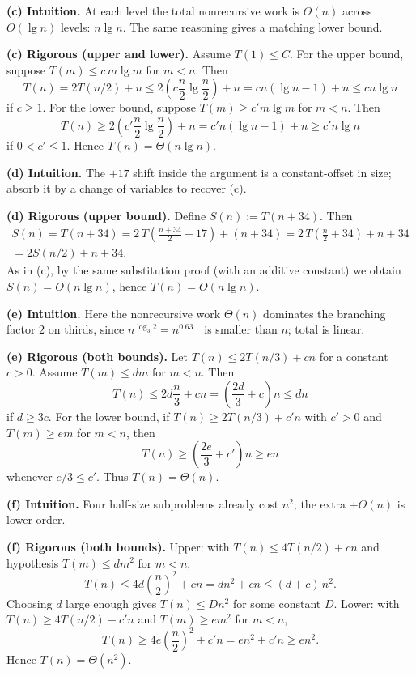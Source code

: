 \documentclass[12pt]{article}
\theoremstyle{definition}
\begin{document}
\textbf{(c) Intuition.}
At each level the total nonrecursive work is $\Theta(n)$ across $O(\lg n)$ levels: $n\lg n$.
The same reasoning gives a matching lower bound.

\textbf{(c) Rigorous (upper and lower).}
Assume $T(1)\le C$.
For the upper bound, suppose $T(m)\le c\, m\lg m$ for $m<n$.
Then
\[
T(n)=2T(n/2)+n\le 2\!\left(c\frac{n}{2}\lg\!\frac{n}{2}\right)+n
= c n(\lg n - 1)+n \le c n\lg n
\]
if $c\ge 1$. For the lower bound, suppose $T(m)\ge c' m\lg m$ for $m<n$.
Then
\[
T(n)\ge 2\!\left(c'\frac{n}{2}\lg\!\frac{n}{2}\right)+n
= c' n(\lg n-1)+n \ge c' n\lg n
\]
if $0<c'\le 1$. Hence $T(n)=\Theta(n\lg n)$.

\textbf{(d) Intuition.}
The $+17$ shift inside the argument is a constant-offset in size; absorb it by a change of variables to recover (c).

\textbf{(d) Rigorous (upper bound).}
Define $S(n):=T(n+34)$. Then
\begin{align}
S(n)=T(n+34)=2\,T\!\left(\frac{n+34}{2}+17\right)+(n+34)
=2\,T\!\left(\frac{n}{2}+34\right)+n+34\\
=2S(n/2)+n+34.
\end{align}
As in (c), by the same substitution proof (with an additive constant) we obtain $S(n)=O(n\lg n)$,
hence $T(n)=O(n\lg n)$.

\textbf{(e) Intuition.}
Here the nonrecursive work $\Theta(n)$ dominates the branching factor $2$ on thirds,
since $n^{\log_3 2}=n^{0.63\ldots}$ is smaller than $n$; total is linear.

\textbf{(e) Rigorous (both bounds).}
Let $T(n)\le 2T(n/3)+c n$ for a constant $c>0$.
Assume $T(m)\le d m$ for $m<n$. Then
\[
T(n)\le 2 d\frac{n}{3}+c n = \left(\frac{2d}{3}+c\right)n \le d n
\]
if $d\ge 3c$. For the lower bound, if $T(n)\ge 2T(n/3)+c' n$ with $c'>0$
and $T(m)\ge e m$ for $m<n$, then
\[
T(n)\ge \left(\frac{2e}{3}+c'\right)n \ge e n
\]
whenever $e/3\le c'$. Thus $T(n)=\Theta(n)$.

\textbf{(f) Intuition.}
Four half-size subproblems already cost $n^2$; the extra $+\Theta(n)$ is lower order.

\textbf{(f) Rigorous (both bounds).}
Upper: with $T(n)\le 4T(n/2)+c n$ and hypothesis $T(m)\le d m^2$ for $m<n$,
\[
T(n)\le 4 d\left(\frac{n}{2}\right)^2 + c n = d n^2 + c n \le (d+c)\, n^2.
\]
Choosing $d$ large enough gives $T(n)\le D n^2$ for some constant $D$.
Lower: with $T(n)\ge 4T(n/2)+c' n$ and $T(m)\ge e m^2$ for $m<n$,
\[
T(n)\ge 4 e\left(\frac{n}{2}\right)^2 + c' n = e n^2 + c' n \ge e n^2.
\]
Hence $T(n)=\Theta(n^2)$.
\end{document}
